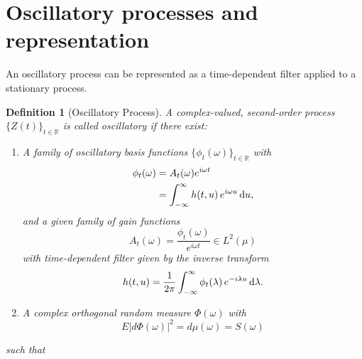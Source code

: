 \documentclass{article}
\newtheorem{definition}{Definition}
\begin{document}
\section{Oscillatory processes and representation}

An oscillatory process can be represented as a time-dependent filter applied
to a stationary process.

\begin{definition}[Oscillatory Process]
  \label{def:oscillatory}A complex-valued, second-order process $\{Z (t)\}_{t
  \in \mathbb{R}}$ is called oscillatory if there exist:
  \begin{enumerate}
    \item A family of oscillatory basis functions $\{\phi_t (\omega)\}_{t \in
    \mathbb{R}}$ with
    \begin{equation}
      \begin{aligned}
        \phi_t (\omega) & = A_t (\omega) e^{i \omega t}\\
        & = \int_{- \infty}^{\infty} h (t, u)  \hspace{0.17em} e^{i \omega u}
        \hspace{0.17em} \mathrm{d} u,
      \end{aligned}
    \end{equation}
    and a given family of gain functions
    \begin{equation}
      A_t (\omega) = \frac{\phi_t (\omega)}{e^{i \omega t}} \in L^2 (\mu)
      \label{envelope}
    \end{equation}
    with time-dependent filter given by the inverse transform
    \begin{equation}
      h (t, u) = \frac{1}{2 \pi}  \int_{- \infty}^{\infty} \phi_t (\lambda) 
      \hspace{0.17em} e^{- i \lambda u} \hspace{0.17em} \mathrm{d} \lambda .
    \end{equation}
    \item A complex orthogonal random measure $\Phi (\omega)$ with
    \begin{equation}
      E \lvert d \Phi (\omega) \rvert^2 = d \mu (\omega) = S (\omega)
    \end{equation}
  \end{enumerate}
  such that
  \begin{equation}
    \label{eq:oscillatory_rep}
    

\end{equation}
\end{definition}
\end{document}
